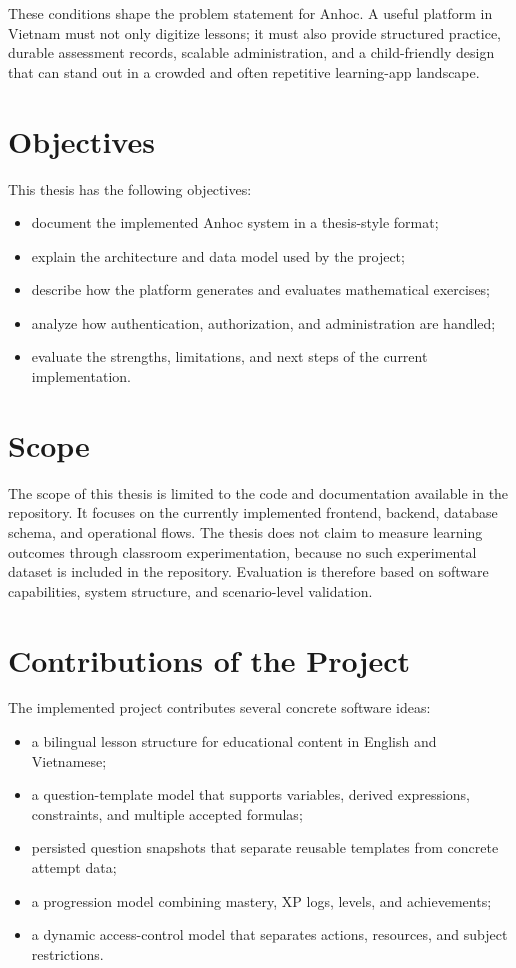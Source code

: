 These conditions shape the problem statement for Anhoc. A useful platform in Vietnam must not only digitize lessons; it must also provide structured practice, durable assessment records, scalable administration, and a child-friendly design that can stand out in a crowded and often repetitive learning-app landscape.

\section{Objectives}

This thesis has the following objectives:
\begin{itemize}
  \item document the implemented Anhoc system in a thesis-style format;
  \item explain the architecture and data model used by the project;
  \item describe how the platform generates and evaluates mathematical exercises;
  \item analyze how authentication, authorization, and administration are handled;
  \item evaluate the strengths, limitations, and next steps of the current implementation.
\end{itemize}

\section{Scope}

The scope of this thesis is limited to the code and documentation available in the repository. It focuses on the currently implemented frontend, backend, database schema, and operational flows. The thesis does not claim to measure learning outcomes through classroom experimentation, because no such experimental dataset is included in the repository. Evaluation is therefore based on software capabilities, system structure, and scenario-level validation.

\section{Contributions of the Project}

The implemented project contributes several concrete software ideas:
\begin{itemize}
  \item a bilingual lesson structure for educational content in English and Vietnamese;
  \item a question-template model that supports variables, derived expressions, constraints, and multiple accepted formulas;
  \item persisted question snapshots that separate reusable templates from concrete attempt data;
  \item a progression model combining mastery, XP logs, levels, and achievements;
  \item a dynamic access-control model that separates actions, resources, and subject restrictions.
\end{itemize}

